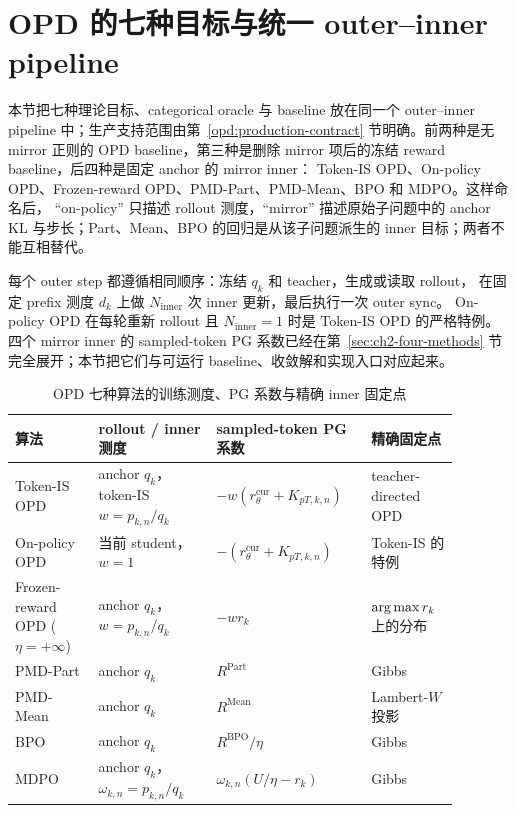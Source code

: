 \section{OPD 的七种目标与统一 outer--inner pipeline}
\label{sec:ch2-opd-baselines}

本节把七种理论目标、categorical oracle 与 baseline 放在同一个 outer--inner pipeline 中；生产支持范围由第~\ref{opd:production-contract} 节明确。前两种是无 mirror 正则的 OPD baseline，第三种是删除 mirror 项后的冻结 reward baseline，后四种是固定 anchor 的 mirror inner： Token-IS OPD、On-policy OPD、Frozen-reward OPD、PMD-Part、PMD-Mean、BPO 和 MDPO。这样命名后， ``on-policy'' 只描述 rollout 测度，``mirror'' 描述原始子问题中的 anchor KL 与步长；Part、Mean、BPO 的回归是从该子问题派生的 inner 目标；两者不能互相替代。

每个 outer step 都遵循相同顺序：冻结 $q_k$ 和 teacher，生成或读取 rollout， 在固定 prefix 测度 $d_k$ 上做 $N_{\mathrm{inner}}$ 次 inner 更新，最后执行一次 outer sync。 On-policy OPD 在每轮重新 rollout 且 $N_{\mathrm{inner}}=1$ 时是 Token-IS OPD 的严格特例。四个 mirror inner 的 sampled-token PG 系数已经在第~\ref{sec:ch2-four-methods} 节完全展开；本节把它们与可运行 baseline、收敛解和实现入口对应起来。

\begin{table}[ht]
\centering
\caption{OPD 七种算法的训练测度、PG 系数与精确 inner 固定点}
\label{tab:ch2-opd-seven-algorithms}
\begin{tabular}{p{0.17\linewidth}p{0.24\linewidth}p{0.30\linewidth}p{0.17\linewidth}}
\toprule
算法 & rollout / inner 测度 & sampled-token PG 系数 & 精确固定点 \\
\midrule
Token-IS OPD & anchor $q_k$，token-IS $w=p_{k,n}/q_k$ & $-w(r_\theta^{\mathrm{cur}}+K_{pT,k,n})$ & teacher-directed OPD \\
On-policy OPD & 当前 student，$w=1$ & $-(r_\theta^{\mathrm{cur}}+K_{pT,k,n})$ & Token-IS 的特例 \\
Frozen-reward OPD ($\eta=+\infty$) & anchor $q_k$，$w=p_{k,n}/q_k$ & $-w r_k$ & $\operatorname*{arg\,max} r_k$ 上的分布 \\
PMD-Part & anchor $q_k$ & $R^{\mathrm{Part}}$ & Gibbs \\
PMD-Mean & anchor $q_k$ & $R^{\mathrm{Mean}}$ & Lambert-$W$ 投影 \\
BPO & anchor $q_k$ & $R^{\mathrm{BPO}}/\eta$ & Gibbs \\
MDPO & anchor $q_k$，$\omega_{k,n}=p_{k,n}/q_k$ & $\omega_{k,n}(U/\eta-r_k)$ & Gibbs \\
\bottomrule
\end{tabular}
\end{table}

